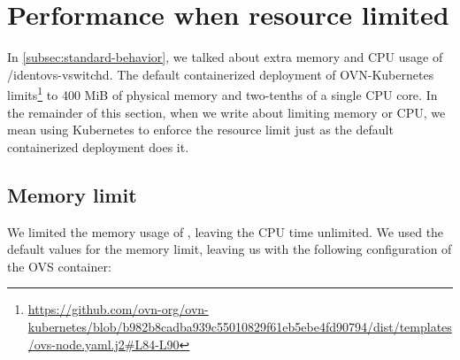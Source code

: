 

\section{Performance when resource limited}

In \cref{subsec:standard-behavior}, we talked about extra memory and CPU usage of /ident{ovs-vswitchd}. The default containerized deployment of OVN-Kubernetes limits\footnote{\url{https://github.com/ovn-org/ovn-kubernetes/blob/b982b8cadba939c55010829f61eb5ebe4fd90794/dist/templates/ovs-node.yaml.j2\#L84-L90}}  to 400 MiB of physical memory and two-tenths of a single CPU core. In the remainder of this section, when we write about limiting memory or CPU, we mean using Kubernetes to enforce the resource limit just as the default containerized deployment does it.

\subsection{Memory limit}
\label{subsec:memory}
We limited the memory usage of , leaving the CPU time unlimited. We used the default values for the memory limit, leaving us with the following configuration of the OVS container:

